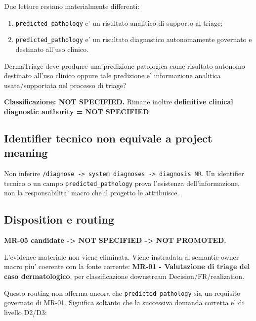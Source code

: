 \documentclass[11pt,a4paper]{article}
\begin{document}
Due letture restano materialmente differenti:

\begin{enumerate}
  \item \texttt{predicted\_pathology} e' un risultato analitico di supporto al triage;
  \item \texttt{predicted\_pathology} e' un risultato diagnostico autonomamente governato e destinato all'uso clinico.
\end{enumerate}

\begin{ddtacheck}[title={Smallest critical proposition}]
DermaTriage deve produrre una predizione patologica come risultato autonomo destinato all'uso clinico oppure tale predizione e' informazione analitica usata/supportata nel processo di triage?
\end{ddtacheck}

\textbf{Classificazione: NOT SPECIFIED.} Rimane inoltre \textbf{definitive clinical diagnostic authority = NOT SPECIFIED}.

\subsection{Identifier tecnico non equivale a project meaning}

\begin{ddtaanti}
Non inferire \texttt{/diagnose -> system diagnoses -> diagnosis MR}. Un identifier tecnico o un campo \texttt{predicted\_pathology} prova l'esistenza dell'informazione, non la responsabilita' macro che il progetto le attribuisce.
\end{ddtaanti}

\subsection{Disposition e routing}

\begin{ddtacore}[title={Candidate MR-05 disposition}]
\textbf{MR-05 candidate -> NOT SPECIFIED -> NOT PROMOTED.}

L'evidence materiale non viene eliminata. Viene instradata al semantic owner macro piu' coerente con la fonte corrente: \textbf{MR-01 - Valutazione di triage del caso dermatologico}, per classificazione downstream Decision/FR/realization.
\end{ddtacore}

Questo routing non afferma ancora che \texttt{predicted\_pathology} sia un requisito governato di MR-01. Significa soltanto che la successiva domanda corretta e' di livello D2/D3:
\end{document}

